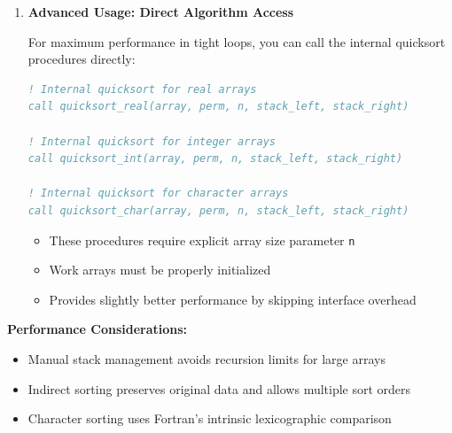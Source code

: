 \documentclass[11pt]{article}
\begin{document}
\begin{enumerate}
\begin{enumerate}
	      	      \textbf{Initialization Pattern:}
	      	      \begin{lstlisting}[language=Fortran]
do i = 1, n
    perm(i) = i          ! Identity permutation
end do
	      	      \end{lstlisting}
	      	      
	      	\item \textbf{Advanced Usage: Direct Algorithm Access}
	      	      
	      	      For maximum performance in tight loops, you can call the internal
	      	      quicksort procedures directly:
	      	      
	      	      \begin{lstlisting}[language=Fortran]
! Internal quicksort for real arrays
call quicksort_real(array, perm, n, stack_left, stack_right)

! Internal quicksort for integer arrays  
call quicksort_int(array, perm, n, stack_left, stack_right)

! Internal quicksort for character arrays
call quicksort_char(array, perm, n, stack_left, stack_right)
	      	      \end{lstlisting}
	      	      
	      	      \begin{itemize}
	      	      	\item These procedures require explicit array size parameter \texttt{n}
	      	      	      
	      	      	\item Work arrays must be properly initialized
	      	      	      
	      	      	\item Provides slightly better performance by skipping interface overhead
	      	      \end{itemize}
	      \end{enumerate}
	      
	      \textbf{Performance Considerations:}
	      \begin{itemize}
	      	\item Manual stack management avoids recursion limits for large arrays
	      	      
	      	\item Indirect sorting preserves original data and allows multiple sort orders
	      	      
	      	\item Character sorting uses Fortran's intrinsic lexicographic comparison
	      	      

\end{itemize}
\end{enumerate}
\end{document}
